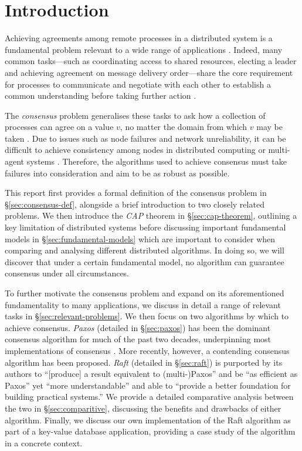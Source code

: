 \documentclass[12pt, a4paper]{article}
\begin{document}
\section{Introduction}

Achieving agreements among remote processes in a distributed system is a
fundamental problem relevant to a wide range of applications
\cite{fischer1985impossibility, kshemkalyani_singhal_2008}. Indeed, many common
tasks---such as coordinating access to shared resources, electing a leader and
achieving agreement on message delivery order---share the core requirement for
processes to communicate and negotiate with each other to establish a common
understanding before taking further action \cite{kshemkalyani_singhal_2008,
coulouris2005distributed}.

The \textit{consensus} problem generalises these tasks to ask how a collection
of processes can agree on a value $v$, no matter the domain from which $v$ may
be taken \cite{coulouris2005distributed}. Due to issues such as node failures
and network unreliability, it can be difficult to achieve consistency among
nodes in distributed computing or multi-agent systems
\cite{coulouris2005distributed}. Therefore, the algorithms used to achieve
consensus must take failures into consideration and aim to be as robust as
possible.

This report first provides a formal definition of the consensus problem in
\S\ref{sec:consensus-def}, alongside a brief introduction to two closely related
problems. We then introduce the \textit{CAP} theorem in \S\ref{sec:cap-theorem},
outlining a key limitation of distributed systems before discussing important
fundamental models in \S\ref{sec:fundamental-models} which are important to
consider when comparing and analysing different distributed algorithms. In doing
so, we will discover that under a certain fundamental model, no algorithm can
guarantee consensus under all circumstances.

To further motivate the consensus problem and expand on its aforementioned
fundamentality to many applications, we discuss in detail a range of relevant
tasks in \S\ref{sec:relevant-problems}. We then focus on two algorithms by which
to achieve consensus. \textit{Paxos} \cite{lamport1998part, lamport2001paxos}
(detailed in \S\ref{sec:paxos}) has been the dominant consensus algorithm for
much of the past two decades, underpinning most implementations of consensus
\cite{ongaro2014search}. More recently, however, a contending consensus
algorithm has been proposed. \textit{Raft} \cite{ongaro2014search} (detailed in
\S\ref{sec:raft}) is purported by its authors to ``[produce] a result equivalent
to (multi-)Paxos'' and be ``as efficient as Paxos'' yet ``more understandable''
and able to ``provide a better foundation for building practical systems.''
\cite{ongaro2014search} We provide a detailed comparative analysis between the
two in \S\ref{sec:comparitive}, discussing the benefits and drawbacks of either
algorithm. Finally, we discuss our own implementation of the
Raft algorithm as part of a key-value database
application, providing a case study of the algorithm in a concrete context.
\end{document}
